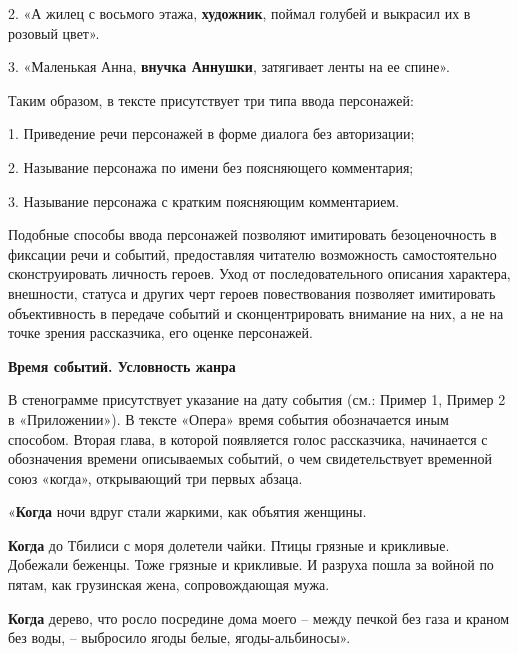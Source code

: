 \documentclass{kursa4}
\begin{document}
    {\color[rgb]{0.2,0.2,0.2}
    2. «А жилец с восьмого этажа, \textbf{художник}, поймал голубей и
    выкрасил их в розовый цвет».}

    {\color[rgb]{0.2,0.2,0.2}
    \textcolor[rgb]{0.0,0.0,0.039215688}{}\textcolor[rgb]{0.0,0.0,0.039215688}{3.
    «}Маленькая Анна, \textbf{внучка Аннушки}, затягивает ленты на ее
    спине».}

    {\color[rgb]{0.2,0.2,0.2}
    Таким образом, в тексте присутствует три типа ввода персонажей: }

    {\color[rgb]{0.2,0.2,0.2}
    1. Приведение речи персонажей в форме диалога без авторизации;}

    {\color[rgb]{0.2,0.2,0.2}
    2. Называние персонажа по имени без поясняющего комментария;}

    {\color[rgb]{0.2,0.2,0.2}
    3. Называние персонажа с кратким поясняющим комментарием.}

    {\color[rgb]{0.2,0.2,0.2}
    Подобные способы ввода персонажей позволяют имитировать
    безоценочность в фиксации речи и событий, предоставляя читателю
    возможность самостоятельно сконструировать личность героев. Уход от
    последовательного описания характера, внешности, статуса и других черт
    героев повествования позволяет имитировать объективность в передаче
    событий и сконцентрировать внимание на них, а не на точке зрения
    рассказчика, его оценке персонажей. }

    {\centering\bfseries\color[rgb]{0.2,0.2,0.2}
    Время событий. Условность жанра
    \par}

    {\color[rgb]{0.2,0.2,0.2}
    В стенограмме присутствует указание на дату события (см.: Пример
    1, Пример 2 в «Приложении»). В тексте «Опера» время события
    обозначается иным способом. Вторая глава, в которой появляется голос
    рассказчика, начинается с обозначения времени описываемых событий, о
    чем свидетельствует временной союз «когда», открывающий три первых
    абзаца. }

    {\color[rgb]{0.2,0.2,0.2}
    «\textbf{Когда} ночи вдруг стали жаркими, как объятия женщины.}

    {\color[rgb]{0.2,0.2,0.2}
    \textbf{Когда} до Тбилиси с моря долетели чайки. Птицы грязные и
    крикливые. Добежали беженцы. Тоже грязные и крикливые. И разруха пошла
    за войной по пятам, как грузинская жена, сопровождающая мужа.}

    {\color[rgb]{0.2,0.2,0.2}
    \textbf{Когда} дерево, что росло посредине дома моего – между печкой
    без газа и краном без воды, – выбросило ягоды белые, ягоды-альбиносы».}
\end{document}
